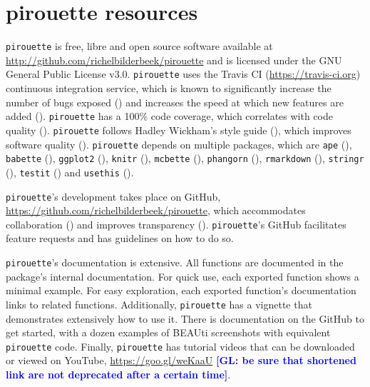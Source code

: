 \documentclass{article}
\newcommand{\giovanni}[1]{\textcolor{blue}{\textbf{[GL: #1]}}}
\begin{document}
\section{pirouette resources}

\verb;pirouette; is free, libre and open source software available at 
\url{http://github.com/richelbilderbeek/pirouette}
and is licensed under the GNU General Public License v3.0.
\verb;pirouette; uses the Travis CI (\url{https://travis-ci.org})
continuous integration service, which is known to significantly 
increase the number of bugs exposed (\cite{vasilescu2015}) and increases
the speed at which new features are added (\cite{vasilescu2015}).
\verb;pirouette; has a 100\% code coverage, which correlates with 
code quality (\cite{horgan1994,del1995correlation}). 
\verb;pirouette; follows Hadley Wickham's style guide (\cite{style_guide}), 
which improves software quality (\cite{fang2001}).
\verb;pirouette; depends on multiple packages, which are 
\verb;ape; (\cite{APE}), 
\verb;babette; (\cite{bilderbeek2018babette}),
\verb;ggplot2; (\cite{ggplot2}),
\verb;knitr; (\cite{knitr}),
\verb;mcbette; (\cite{mcbette}),
\verb;phangorn; (\cite{phangorn}),
\verb;rmarkdown; (\cite{rmarkdown}),
\verb;stringr; (\cite{stringr}),
\verb;testit; (\cite{testit}) and 
\verb;usethis; (\cite{usethis}).

\verb;pirouette;'s development takes place on GitHub,
\url{https://github.com/richelbilderbeek/pirouette}, 
which accommodates collaboration (\cite{perez2016ten}) 
and improves transparency (\cite{gorgolewski2016practical}).
\verb;pirouette;'s GitHub facilitates feature requests and 
has guidelines on how to do so.

\verb;pirouette;'s documentation is extensive. All functions are documented
in the package's internal documentation. For quick use, 
each exported function shows a minimal example. 
For easy exploration, each exported function's documentation links to related functions.
Additionally, \verb;pirouette; has a vignette that demonstrates extensively how
to use it. There is documentation on the GitHub to get started, 
with a dozen examples of BEAUti screenshots with equivalent \verb;pirouette; code.
Finally, \verb;pirouette; has tutorial videos that can 
be downloaded or viewed on YouTube, \url{https://goo.gl/weKaaU} \giovanni{be sure that shortened link are not deprecated after a certain time}.

\end{document}
